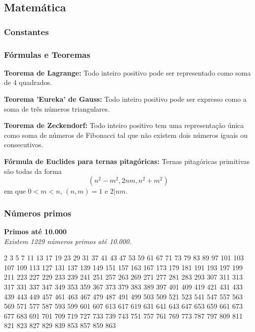 \subsection{Matemática}
\subsubsection{Constantes}


\subsubsection{Fórmulas e Teoremas}

\textbf{Teorema de Lagrange:} Todo inteiro positivo pode ser representado como soma de $4$ quadrados.

\textbf{Teorema 'Eureka' de Gauss:} Todo inteiro positivo pode ser expresso como a soma de três números triangulares.

\textbf{Teorema de Zeckendorf:} Todo inteiro positivo tem uma representação única como soma de números de Fibonacci tal que não existem dois números iguais ou consecutivos.

\textbf{Fórmula de Euclides para ternas pitagóricas:} Ternas pitagóricas primitivas são todas da forma 
$$ (n^2 - m^2, 2nm, n^2 + m^2)$$
em que $0 < m < n$, $(n, m) = 1$ e $2 | nm$.
\subsubsection{Números primos}

\textbf{Primos até 10.000} \\
\textit{Existem 1229 números primos até 10.000.}

    2
    3
    5
    7
    11
    13
    17
    19
    23
    29
    31
    37
    41
    43
    47
    53
    59
    61
    67
    71
    73
    79
    83
    89
    97
    101
    103
    107
    109
    113
    127
    131
    137
    139
    149
    151
    157
    163
    167
    173
    179
    181
    191
    193
    197
    199
    211
    223
    227
    229
    233
    239
    241
    251
    257
    263
    269
    271
    277
    281
    283
    293
    307
    311
    313
    317
    331
    337
    347
    349
    353
    359
    367
    373
    379
    383
    389
    397
    401
    409
    419
    421
    431
    433
    439
    443
    449
    457
    461
    463
    467
    479
    487
    491
    499
    503
    509
    521
    523
    541
    547
    557
    563
    569
    571
    577
    587
    593
    599
    601
    607
    613
    617
    619
    631
    641
    643
    647
    653
    659
    661
    673
    677
    683
    691
    701
    709
    719
    727
    733
    739
    743
    751
    757
    761
    769
    773
    787
    797
    809
    811
    821
    823
    827
    829
    839
    853
    857
    859
    863
    

